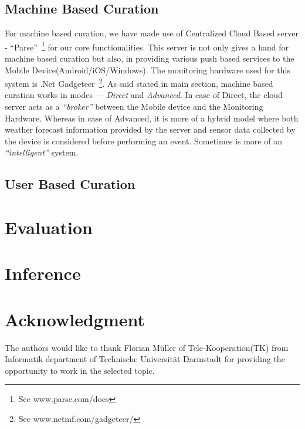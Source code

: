 \documentclass[10pt]{article}
\begin{document}
\subsection*{Machine Based Curation}

For machine based curation, we have made use of Centralized Cloud Based server - ``Parse''~\footnote{See www.parse.com/docs} for our core functionalities. This server is not only gives a hand for machine based curation but also, in providing various push based services to the Mobile Device(Android/iOS/Windows). The monitoring hardware used for this system is .Net Gadgeteer~\footnote{See www.netmf.com/gadgeteer/}. As said stated in main section, machine based curation works in modes --- \emph{Direct} and \emph{Advanced}. In case of Direct, the cloud server acts as a \emph{``broker''} between the Mobile device and the Monitoring Hardware. Whereas in case of Advanced, it is more of a hybrid model where both weather forecast information provided by the server and sensor data collected by the device is considered before performing an event. Sometimes is more of an \emph{``ìntelligent''} system.

\subsection*{User Based Curation}


\section*{Evaluation}


\section*{Inference}


\section*{Acknowledgment}

The authors would like to thank Florian Müller of Tele-Kooperation(TK) from Informatik department of Technische Universität Darmstadt for providing the opportunity to work in the selected topic.


\end{document}
